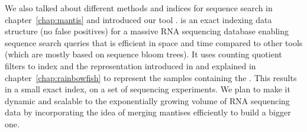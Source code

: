 We also talked about different methods and indices for sequence search
in chapter~\ref{chap:mantis} and introduced our tool \mantis.
\mantis is an exact indexing data structure (no false positives)
for a massive RNA sequencing database enabling sequence
search queries that is efficient in space and time compared to other tools
(which are mostly based on sequence bloom trees). It uses counting quotient filters
to index \kmers and the representation introduced in \rainbowfish
and explained in chapter~\ref{chap:rainbowfish} to represent the samples containing the \kmer.
This results in a small exact index, on a set of sequencing experiments.
We plan to make it dynamic and scalable to the exponentially
growing volume of RNA sequencing data
by incorporating the idea of merging mantises efficiently to build a bigger one.

